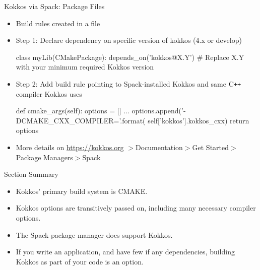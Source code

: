 \begin{frame}[fragile]{Kokkos via Spack: Package Files}
\begin{itemize}
\item Build rules created in a  file
\item Step 1: Declare dependency on specific version of kokkos (4.x or develop)
\begin{shell}
class myLib(CMakePackage):
  depends_on('kokkos@X.Y')  # Replace X.Y with your minimum required Kokkos version
\end{shell}
\item Step 2: Add build rule pointing to Spack-installed Kokkos and same C\texttt{++} compiler Kokkos uses
\begin{shell}
def cmake_args(self):
  options = []
  ...
  options.append('-DCMAKE_CXX_COMPILER={}'.format(
      self['kokkos'].kokkos_cxx)
  return options
\end{shell}
\item More details on \url{https://kokkos.org} $>$Documentation$>$Get Started$>$Package Managers$>$Spack
\end{itemize}
\end{frame}

\begin{frame}{Section Summary}

  \begin{itemize}
    \item{Kokkos' primary build system is CMAKE.}
    \item{Kokkos options are transitively passed on, including many necessary compiler options.}
    \item{The Spack package manager does support Kokkos.}
    \item{If you write an application, and have few if any dependencies, building Kokkos as part of your code is an option.}
  \end{itemize}

\end{frame}
